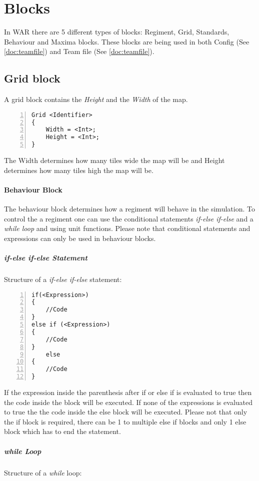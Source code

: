 \section{Blocks}
\label{doc:blocks}
	In WAR there are 5 different types of blocks: Regiment, Grid, Standards, Behaviour and Maxima blocks. 
	These blocks are being used in both Config (See \ref{doc:teamfile}) and Team file (See \ref{doc:teamfile}).
	\subsection{Grid block}
		A grid block contains the {\it Height} and the {\it Width }of the map.

		\begin{lstlisting}[basicstyle=\small\sffamily,
		keywordstyle={\color{blue}},
		comment={[l]{//}}, morecomment={[s]{/*}{*/}}, commentstyle=\itshape,
		columns={[l]flexible}, numbers=left, numberstyle=\tiny,
		frameround=fftt, frame=shadowbox, captionpos=b,
		caption={Grid Block}]
Grid <Identifier>
{
	Width = <Int>;
	Height = <Int>;
}
		\end{lstlisting}	
		The Width determines how many tiles wide the map will be and Height determines how many tiles high the map will be.
	\paragraph{Behaviour Block}
		The behaviour block determines how a regiment will behave in the simulation. To control the a regiment one can 
		use the conditional statements {\it if-else if-else} and a {\it while loop} and using unit functions. Please note that 
		conditional statements and expressions can only be used in behaviour blocks.
		\subparagraph{if-else if-else Statement}
			Structure of a {\it if-else if-else} statement: \\

		\begin{lstlisting}[basicstyle=\small\sffamily,
		keywordstyle={\color{blue}},
		comment={[l]{//}}, morecomment={[s]{/*}{*/}}, commentstyle=\itshape,
		columns={[l]flexible}, numbers=left, numberstyle=\tiny,
		frameround=fftt, frame=shadowbox, captionpos=b,
		caption={if and else if statements}]
if(<Expression>)
{
	//Code
}
else if (<Expression>)
{
	//Code
}
	else
{
	//Code
}
			\end{lstlisting}
			If the expression inside the parenthesis after if or else if is evaluated to true then the code inside the block will be executed.
			If none of the expressions is evaluated to true the the code inside the else block will be executed. Please not that only the if block
			is required, there can be 1 to multiple else if blocks and only 1 else block which has to end the statement. \\
		\subparagraph{while Loop}
			Structure of a {\it while} loop: \\			


